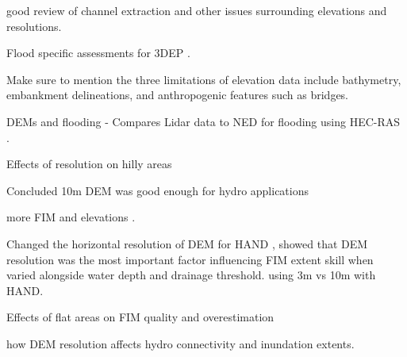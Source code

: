 \documentclass[water,article,submit,pdftex,moreauthors]{dependencies/Definitions/mdpi}
\begin{document}
\cite{tarolli2014high} good review of channel extraction and other issues surrounding elevations and resolutions. 

Flood specific assessments for 3DEP \cite{carswell20183d,bales2009sources,gesch2018best,podhoranyi2015inaccuracy,lamichhane2018effect,tsubaki2013uncertainty,dobbs2010evaluation,arrighi2019effects,zazo2015analysis,bhuyian2018accounting,gesch2012elevation,witt2015evaluation}.

Make sure to mention the three limitations of elevation data include bathymetry, embankment delineations, and anthropogenic features such as bridges.

DEMs and flooding \cite{casas2006topographic,thomas2016quantifying,savage2016does,passalacqua2010geometric,passalacqua2012automatic,munoth2019effects}
 - Compares Lidar data to NED for flooding using HEC-RAS \cite{wang2005comparison}.

Effects of resolution on hilly areas \cite{dai2019effects}

Concluded 10m DEM was good enough for hydro applications \cite{zhang1994digital}

more FIM and elevations \cite{werner2001impact,omer2003impact,bates2003optimal,tate2002creating,colby2000modeling}.

Changed the horizontal resolution of DEM for HAND \cite{li2022accounting}, showed that DEM resolution was the most important factor influencing FIM extent skill when varied alongside water depth and drainage threshold.
\cite{garousi2019terrain} using 3m vs 10m with HAND.

Effects of flat areas on FIM quality and overestimation \cite{garousi2019terrain,godbout2019error,jafarzadegan2017based,papaioannou2017probabilistic}

\cite{lopez2018influence} how DEM resolution affects hydro connectivity and inundation extents.
\end{document}
